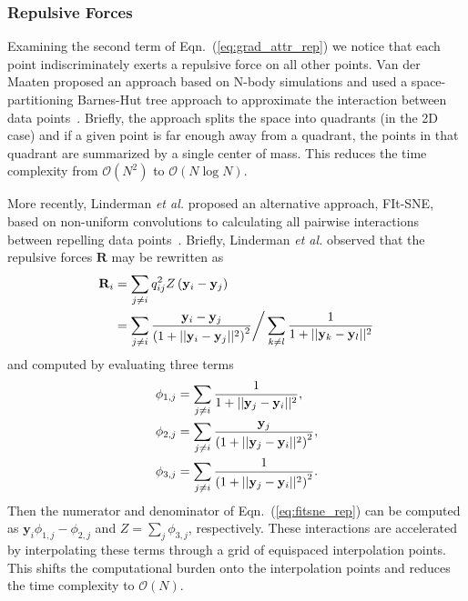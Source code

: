 \documentclass[twocolumn]{bmcart}
\begin{document}
\subsubsection*{Repulsive Forces}

Examining the second term of Eqn.~(\ref{eq:grad_attr_rep}) we notice that each
point indiscriminately exerts a repulsive force on all other points. Van der
Maaten proposed an approach based on N-body simulations and used a
space-partitioning Barnes-Hut tree approach to approximate the interaction
between data points~\cite{van2014accelerating}. Briefly, the approach splits
the space into quadrants (in the 2D case) and if a given point is far enough
away from a quadrant, the points in that quadrant are summarized by a single
center of mass. This reduces the time complexity from $\mathcal{O}(N^2)$ to
$\mathcal{O}(N \log N)$.

More recently, Linderman \textit{et al.} proposed an alternative approach,
FIt-SNE, based on non-uniform convolutions to calculating all pairwise
interactions between repelling data points~\cite{linderman2019fast}. Briefly,
Linderman \textit{et al.} observed that the repulsive forces $\mathbf{R}$ may
be rewritten as \begin{align}
\mathbf{R}_i &= \sum_{j \neq i} q_{ij}^2 Z \left ( \mathbf{y}_i - \mathbf{y}_j \right ) \notag \\
&= \sum_{j \neq i} \frac{\mathbf{y}_i - \mathbf{y}_j}{\left ( 1 + || \mathbf{y}_i - \mathbf{y}_j ||^2 \right )^{2}}
\bigg/
\sum_{k \neq l} \frac{1}{1 + || \mathbf{y}_k - \mathbf{y}_l || ^2} \label{eq:fitsne_rep}
\end{align} 
and computed by evaluating three terms
\begin{align}
\phi_{1, j} &= \sum_{j \neq i} \frac{1}{1 + || \mathbf{y}_j - \mathbf{y}_i ||^2}, \notag \\
\phi_{2, j} &= \sum_{j \neq i} \frac{\mathbf{y}_j}{\left( 1 + || \mathbf{y}_j - \mathbf{y}_i ||^2 \right)^2}, \notag \\
\phi_{3, j} &= \sum_{j \neq i} \frac{1}{\left( 1 + || \mathbf{y}_j - \mathbf{y}_i ||^2 \right)^2}. \label{eq:fitsne_terms}
\end{align}
Then the numerator and denominator of Eqn.~(\ref{eq:fitsne_rep}) can be
computed as $\mathbf{y}_i \phi_{1,j} - \phi_{2,j}$ and $Z = \sum_j \phi_{3,j}$,
respectively. These interactions are accelerated by interpolating these terms
through a grid of equispaced interpolation points. This shifts the
computational burden onto the interpolation points and reduces the time
complexity to $\mathcal{O}(N)$.
\end{document}
